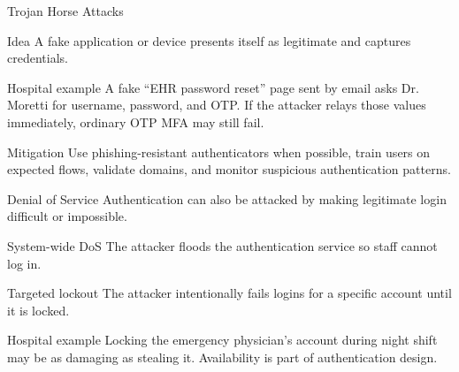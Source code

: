 \documentclass[presentation]{beamer}
\begin{document}
\begin{frame}[c]{Trojan Horse Attacks}
  \begin{block}{Idea}
    A fake application or device presents itself as legitimate and captures credentials.
  \end{block}

  \begin{exampleblock}{Hospital example}
    A fake ``EHR password reset'' page sent by email asks Dr. Moretti for username, password, and OTP. If the attacker relays those values immediately, ordinary OTP MFA may still fail.
  \end{exampleblock}

  \begin{block}{Mitigation}
    Use phishing-resistant authenticators when possible, train users on expected flows, validate domains, and monitor suspicious authentication patterns.
  \end{block}
\end{frame}

\begin{frame}[c]{Denial of Service}
  Authentication can also be attacked by making legitimate login difficult or impossible.

  \begin{block}{System-wide DoS}
    The attacker floods the authentication service so staff cannot log in.
  \end{block}

  \begin{block}{Targeted lockout}
    The attacker intentionally fails logins for a specific account until it is locked.
  \end{block}

  \begin{exampleblock}{Hospital example}
    Locking the emergency physician's account during night shift may be as damaging as stealing it. Availability is part of authentication design.
  \end{exampleblock}
\end{frame}
\end{document}
